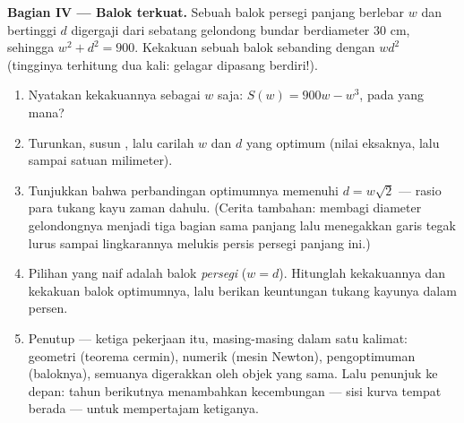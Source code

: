 \begin{problem}
\medskip
\noindent\textbf{Bagian IV --- Balok terkuat.}
Sebuah balok persegi panjang berlebar $w$ dan bertinggi $d$ digergaji dari
sebatang gelondong bundar berdiameter $30$ cm, sehingga $w^2 + d^2 = 900$.
Kekakuan sebuah balok sebanding dengan $w d^2$ (tingginya terhitung dua kali:
gelagar dipasang berdiri!).
\begin{enumerate}[resume]
  \item Nyatakan kekakuannya sebagai  $w$ saja:
        $S(w) = 900w - w^3$, pada  yang mana?
  \item Turunkan, susun , lalu carilah
        $w$ dan $d$ yang optimum (nilai eksaknya, lalu sampai satuan
        milimeter).
  \item Tunjukkan bahwa perbandingan optimumnya memenuhi
        $d = w\sqrt2$ --- rasio para tukang kayu zaman dahulu. (Cerita
        tambahan: membagi diameter gelondongnya menjadi tiga bagian sama
        panjang lalu menegakkan garis tegak lurus sampai lingkarannya
        melukis persis persegi panjang ini.)
  \item Pilihan yang naif adalah balok \emph{persegi}
        ($w = d$). Hitunglah kekakuannya dan kekakuan balok
        optimumnya, lalu berikan keuntungan tukang kayunya dalam persen.
  \item Penutup --- ketiga pekerjaan  itu, masing-masing
        dalam satu kalimat:
        geometri (teorema cermin), numerik (mesin
        Newton), pengoptimuman (baloknya), semuanya digerakkan oleh
        objek yang sama. Lalu penunjuk ke depan: tahun berikutnya menambahkan
        kecembungan --- sisi kurva tempat  berada --- untuk
        mempertajam ketiganya.

\end{enumerate}
\end{problem}
